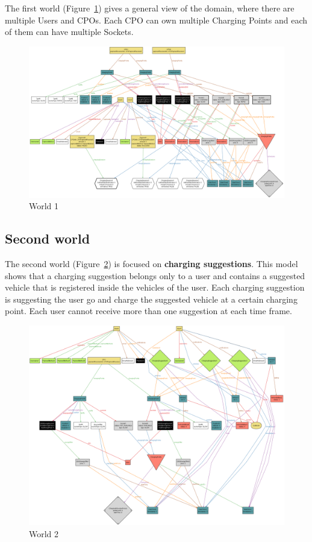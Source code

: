 \documentclass{Configuration_Files/PoliMi3i_thesis}
\begin{document}
The first world (Figure~\ref{fig:world1}) gives a general view of the domain, where there are multiple Users and CPOs. Each CPO can own multiple Charging Points and each of them can have multiple Sockets.

\begin{figure}[H]
    \centering
    \includegraphics[width=1\textwidth]{Images/alloy/world1.png}
    \caption{World 1}
    \label{fig:world1}
\end{figure}

\subsection{Second world}

The second world (Figure~\ref{fig:world2}) is focused on \textbf{charging suggestions}. This model shows that a charging suggestion belongs only to a user and contains a suggested vehicle that is registered inside the vehicles of the user. Each charging suggestion is suggesting the user go and charge the suggested vehicle at a certain charging point. Each user cannot receive more than one suggestion at each time frame.

\begin{figure}[H]
    \centering
    \includegraphics[width=1\textwidth]{Images/alloy/world2.png}
    \caption{World 2}
    \label{fig:world2}
\end{figure}
\end{document}
